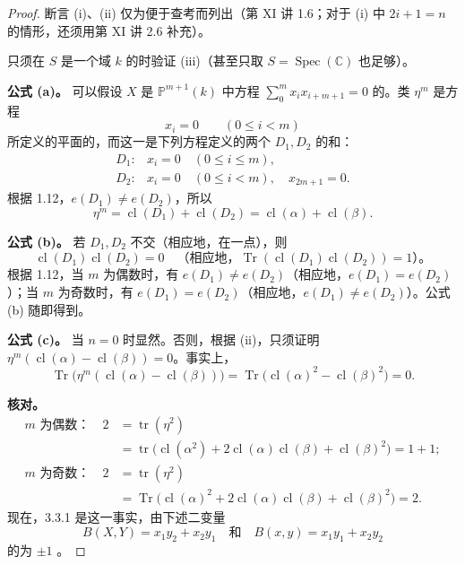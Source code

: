 \begin{proof}
断言 (i)、(ii) 仅为便于查考而列出（第 XI 讲 1.6；对于 (i) 中 $2i+1=n$ 的情形，还须用第 XI 讲 2.6 补充）。

只须在 $S$ 是一个域 $k$ 的时验证 (iii)（甚至只取 $S=\operatorname{Spec}(\mathbb C)$ 也足够）。

\textbf{公式 (a)。} 可以假设 $X$ 是 $\mathbb P^{m+1}(k)$ 中方程 $\sum_0^m x_ix_{i+m+1}=0$ 的。类 $\eta^m$ 是方程
\[
x_i=0\qquad(0\le i<m)
\]
所定义的平面的，而这一是下列方程定义的两个 $D_1,D_2$ 的和：
\[
\begin{array}{ll}
D_1:&x_i=0\quad(0\le i\le m),\\
D_2:&x_i=0\quad(0\le i<m),\quad x_{2m+1}=0.
\end{array}
\]
根据 1.12，$e(D_1)\ne e(D_2)$，所以
\[
\eta^m=\operatorname{cl}(D_1)+\operatorname{cl}(D_2)=\operatorname{cl}(\alpha)+\operatorname{cl}(\beta).
\]

\textbf{公式 (b)。} 若 $D_1,D_2$ 不交（相应地，在一点），则
\[
\operatorname{cl}(D_1)\operatorname{cl}(D_2)=0
\quad\text{（相应地，}\operatorname{Tr}(\operatorname{cl}(D_1)\operatorname{cl}(D_2))=1\text{）。}
\]
根据 1.12，当 $m$ 为偶数时，有 $e(D_1)\ne e(D_2)$（相应地，$e(D_1)=e(D_2)$）；当 $m$ 为奇数时，有 $e(D_1)=e(D_2)$（相应地，$e(D_1)\ne e(D_2)$）。公式 (b) 随即得到。

\textbf{公式 (c)。} 当 $n=0$ 时显然。否则，根据 (ii)，只须证明 $\eta^m(\operatorname{cl}(\alpha)-\operatorname{cl}(\beta))=0$。事实上，
\[
\operatorname{Tr}\bigl(\eta^m(\operatorname{cl}(\alpha)-\operatorname{cl}(\beta))\bigr)
=\operatorname{Tr}\bigl(\operatorname{cl}(\alpha)^2-\operatorname{cl}(\beta)^2\bigr)=0.
\]

\textbf{核对。}
\[
\begin{aligned}
m\text{ 为偶数：}\quad
2&=\operatorname{tr}(\eta^2)\\
&=\operatorname{tr}\bigl(\operatorname{cl}(\alpha^2)+2\operatorname{cl}(\alpha)\operatorname{cl}(\beta)+\operatorname{cl}(\beta)^2\bigr)=1+1;\\
m\text{ 为奇数：}\quad
2&=\operatorname{tr}(\eta^2)\\
&=\operatorname{Tr}\bigl(\operatorname{cl}(\alpha)^2+2\operatorname{cl}(\alpha)\operatorname{cl}(\beta)+\operatorname{cl}(\beta)^2\bigr)=2.
\end{aligned}
\]
现在，3.3.1 是这一事实，由下述二变量
\[
B(X,Y)=x_1y_2+x_2y_1\quad\text{和}\quad B(x,y)=x_1y_1+x_2y_2
\]
的为 $\pm1$ 。
\end{proof}

